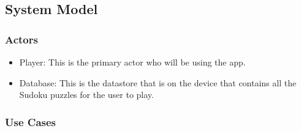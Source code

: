 \documentclass{article}
\begin{document}
\subsection{System Model}

\subsubsection{Actors}

\begin{itemize}
   \item Player: This is the primary actor who will be using the app.
   \item Database: This is the datastore that is on the device that contains all the Sudoku puzzles for the user to play.
\end{itemize}

\subsubsection{Use Cases}
\end{document}
